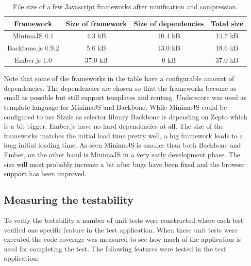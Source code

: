 \begin{table}[H]
	\begin{center}
		\begin{tabular}{ c | c | c | c }
			\hline
			\textbf{Framework}	& \textbf{Size of framework}	& \textbf{Size of dependencies} & \textbf{Total size} \\ \hline
			MinimaJS 0.1			& 4.3 kB						& 10.4 kB						& 14.7 kB \\
			Backbone.js 0.9.2	& 5.6 kB						& 13.0 kB						& 18.6 kB \\
			Ember.js 1.0		& 37.0 kB						& 0 kB						 	& 37.0 kB \\ \hline
		\end{tabular}
		\caption{File size of a few Javascript frameworks after minification and compression.}
		\label{table:frameworks_filesize}
	\end{center}
\end{table}

Note that some of the frameworks in the table have a configurable amount of dependencies. The dependencies are chosen so that the frameworks become as small as possible but still support templates and routing. Underscore was used as template language for MinimaJS and Backbone. While MinimaJS could be configured to use Sizzle as selector library Backbone is depending on Zepto which is a bit bigger. Ember.js have no hard dependencies at all. The size of the frameworks matches the initial load time pretty well, a big framework leads to a long initial loading time. As seen MinimaJS is smaller than both Backbone and Ember, on the other hand is MinimaJS in a very early development phase. The size will most probably increase a bit after bugs have been fixed and the browser support has been improved.

\subsection{Measuring the testability}

To verify the testability a number of unit tests were constructed where each test verified one specific feature in the test application. When these unit tests were executed the code coverage was measured to see how much of the application is used for completing the test. The following features were tested in the test application:

